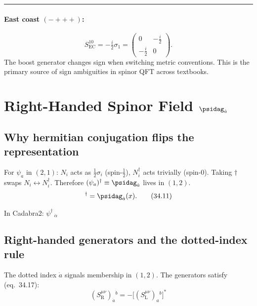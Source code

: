 \medskip\noindent\rule{\linewidth}{0.4pt}\medskip

\paragraph{East coast $(-{+}{+}{+})$:}
\[
  S^{10}_{\mathrm{EC}} = -\tfrac{i}{2}\sigma_1
  = \begin{pmatrix}0 & -\tfrac{i}{2} \\ -\tfrac{i}{2} & 0\end{pmatrix}.
\]
The boost generator changes sign when switching metric conventions.
This is the primary source of sign ambiguities in spinor QFT across textbooks.

\section{Right-Handed Spinor Field
         \texorpdfstring{$\psidag_{\dot{a}}$}{psi-dagger}}

\subsection{Why hermitian conjugation flips the representation}

For $\psi_a$ in $(2,1)$:
$N_i$ acts as $\tfrac{1}{2}\sigma_i$ (spin-$\tfrac{1}{2}$),
$N^\dagger_i$ acts trivially (spin-$0$).
Taking $\dagger$ swaps $N_i \leftrightarrow N^\dagger_i$.
Therefore $(\psi_a)^\dagger \equiv \psidag_{\dot{a}}$ lives in $(1,2)$.
\begin{equation}
  [\psi_a(x)]^\dagger = \psidag_{\dot{a}}(x).
  \tag{34.11}
\end{equation}

\noindent In Cadabra2: $\psi^{\dagger}\,_{\dot{\alpha}}$

\subsection{Right-handed generators and the dotted-index rule}

The dotted index $\dot{a}$ signals membership in $(1,2)$.
The generators satisfy (eq.~34.17):
\begin{equation}
  \boxed{(S^{\mu\nu}_{\mathrm{R}})_{\dot{a}}{}^{\dot{b}}
  = -\bigl[(S^{\mu\nu}_{\mathrm{L}})_a{}^b\bigr]^*}
  \tag{34.17}
\end{equation}

